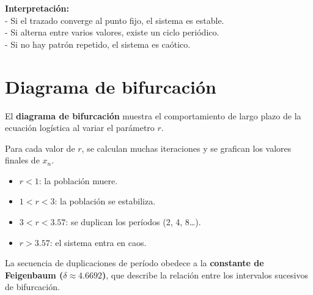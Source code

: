 \documentclass[
  letterpaper,
  DIV=11,
  numbers=noendperiod]{scrreprt}
\providecommand{\tightlist}{%
  \setlength{\itemsep}{0pt}\setlength{\parskip}{0pt}}
\begin{document}
\textbf{Interpretación:}\\
- Si el trazado converge al punto fijo, el sistema es estable.\\
- Si alterna entre varios valores, existe un ciclo periódico.\\
- Si no hay patrón repetido, el sistema es caótico.

\section{Diagrama de bifurcación}\label{diagrama-de-bifurcaciuxf3n}

El \textbf{diagrama de bifurcación} muestra el comportamiento de largo
plazo de la ecuación logística al variar el parámetro \(r\).

Para cada valor de \(r\), se calculan muchas iteraciones y se grafican
los valores finales de \(x_n\).

\begin{itemize}
\tightlist
\item
  \(r < 1\): la población muere.
\item
  \(1 < r < 3\): la población se estabiliza.
\item
  \(3 < r < 3.57\): se duplican los períodos (2, 4, 8\ldots).
\item
  \(r > 3.57\): el sistema entra en caos.
\end{itemize}

La secuencia de duplicaciones de período obedece a la \textbf{constante
de Feigenbaum (\(\delta \approx 4.6692\))}, que describe la relación
entre los intervalos sucesivos de bifurcación.
\end{document}
